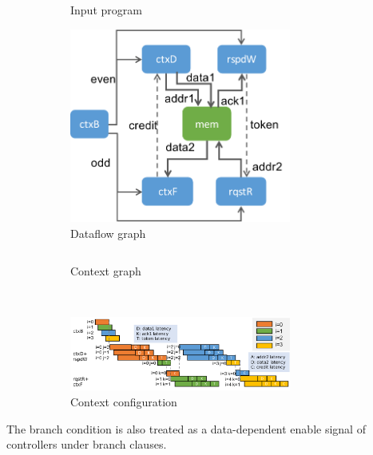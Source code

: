 \begin{figure}
\centering
\begin{subfigure}[b]{0.45\textwidth}
\inputminted{python}{code/branch.py}
\caption{Input program}
  \vspace{0.2cm}
\includegraphics[width=0.8\textwidth]{figs/branchctx.pdf}
\caption{Dataflow graph}
\end{subfigure}
\hfill
\begin{subfigure}[b]{0.48\textwidth}
\inputminted{python}{code/branchctx.py}
\caption{Context graph}
\end{subfigure}
\\
  \vspace{0.2cm}
\begin{subfigure}[b]{\textwidth}
  \centering
\includegraphics[width=0.8\textwidth]{figs/branchtiming.pdf}
\caption{Context configuration}
\end{subfigure}
\caption[Branching example]{
}
\label{fig:dynrange}
\end{figure}
The branch condition is also treated as a data-dependent enable signal of controllers under branch clauses.


